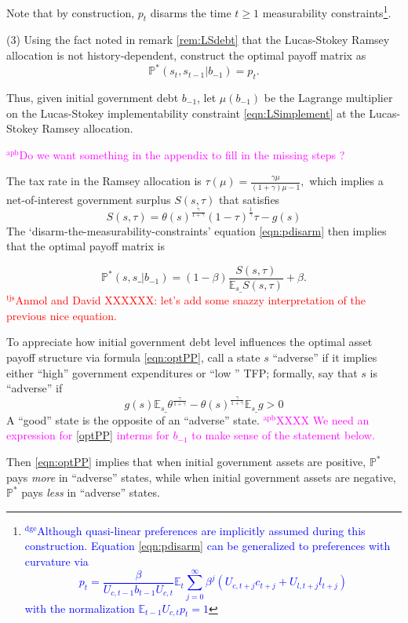 \documentclass[12pt]{article}
\newcommand{\dge}[1]{\textcolor{blue}{$^{\textrm{dge}}${#1}}}
\newcommand{\apb}[1]{\textcolor{magenta}{$^{\textrm{apb}}${#1}}}
\newcommand{\tjs}[1]{\textcolor{red}{$^{\textrm{tjs}}${#1}}}
\newcommand{\EE}{\mathbb E}
\begin{document}
Note that by construction, $p_t$   disarms the time  $t\geq 1$
measurability constraints\footnote{\dge{Although quasi-linear preferences are implicitly assumed during this construction.  Equation \eqref{eqn:pdisarm} can be generalized to preferences with curvature via
\[
p_t =  \frac{\beta}{U_{c,t-1}b_{t-1}U_{c,t}}\EE_t\sum_{j=0}^\infty\beta^j\left( U_{c,t+j}c_{t+j}+U_{l,t+j}l_{t+j}\right) \]
with the normalization $\EE_{t-1}U_{c,t}p_t = 1$}}.

\noindent  (3) Using the fact noted in remark \ref{rem:LSdebt} that the Lucas-Stokey Ramsey allocation is not history-dependent,  construct the optimal payoff matrix as
\[\mathbb{P}^*(s_t,s_{t-1}|b_{-1})=p_t.\]

Thus,  given
 initial government debt $b_{-1}$,  let $\mu(b_{-1})$ be the Lagrange multiplier on the Lucas-Stokey implementability constraint \eqref{eqn:LSimplement}
 at the Lucas-Stokey Ramsey allocation.  
 
 \apb{Do we want something in the appendix to fill in the missing steps ?}
 
 The tax rate in the Ramsey allocation is
$
		\tau(\mu) = \frac{\gamma\mu}{(1+\gamma)\mu-1},
	$
 which implies a  net-of-interest government surplus $S(s,\tau)$ that satisfies
\[		S(s,\tau) = \theta(s)^\frac\gamma{1+\gamma}(1-\tau)^\frac1\gamma\tau-g(s)
	\]
The `disarm-the-measurability-constraints' equation \eqref{eqn:pdisarm} then implies that the optimal payoff matrix is

\begin{equation}\label{eqn:optPP}
 \mathbb{P}^*(s, s\_ |b_{-1}) = (1-\beta)\frac{S(s,\tau)}{\EE_{s\_} S(s,\tau)} + \beta.
 \end{equation}
\tjs{Anmol and David XXXXXX: let's add some snazzy interpretation of the previous nice equation.}



To appreciate how  initial government debt level influences the optimal asset payoff structure via formula \eqref{eqn:optPP}, call a
 state $s$ ``adverse''  if it implies either ``high'' government expenditures or ``low '' TFP; formally, say that  $s$ is ``adverse'' if
\[   g(s)\EE_{s\_}\theta^\frac{\gamma}{1+\gamma}-\theta(s)^\frac\gamma{1+\gamma}\EE_{s\_} g >0\]
A ``good'' state is the opposite of an ``adverse'' state.
\apb{XXXX We need an expression for \eqref{optPP} interms for $b_{-1}$ to make sense of the statement below. }

Then \eqref{eqn:optPP} implies that
 when initial government assets are positive, $\mathbb{P}^*$   pays {\em more} in ``adverse'' states, while when initial government assets are
 negative, $\mathbb{P}^*$  pays {\em less} in ``adverse'' states.  
\end{document}
